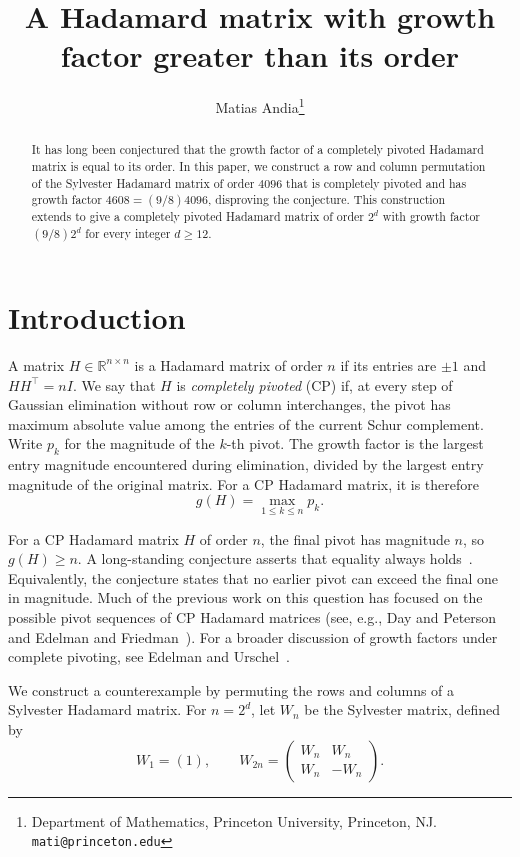 \documentclass{article}
\title{A Hadamard matrix with growth factor greater than its order}
\author{Matias Andia\thanks{Department of Mathematics, Princeton University,
Princeton, NJ. \texttt{mati@princeton.edu}}}
\date{}
\newcommand{\RR}{\mathbb{R}}
\begin{document}
\maketitle

\begin{abstract}
It has long been conjectured that the growth factor of a completely pivoted
Hadamard matrix is equal to its order. In this paper, we construct a row and
column permutation of the Sylvester Hadamard matrix of order $4096$ that is
completely pivoted and has growth factor $4608=(9/8)4096$, disproving the conjecture. This construction extends to give a completely pivoted Hadamard matrix of order $2^d$ with growth factor $(9/8)2^d$ for every integer $d\ge12$.
\end{abstract}

\section{Introduction}\label{sec:introduction}
A matrix $H\in\RR^{n\times n}$ is a Hadamard matrix of order $n$ if its
entries are $\pm1$ and $HH^\top=nI$. We say that $H$ is \emph{completely pivoted} (CP) if, at every step of Gaussian elimination without row or column interchanges, the pivot has maximum absolute value among the entries of the current Schur complement. Write $p_k$ for the magnitude
of the $k$-th pivot. The growth factor is the largest entry magnitude
encountered during elimination, divided by the largest entry magnitude of
the original matrix. For a CP Hadamard matrix, it is therefore
\[
       g(H)=\max_{1\le k\le n}p_k.
\]

For a CP Hadamard matrix $H$ of order $n$, the final pivot has magnitude $n$, so $g(H)\ge n$. A long-standing conjecture asserts that equality always holds~\cite{Cryer,DP}. Equivalently, the conjecture states that no earlier pivot
can exceed the final one in magnitude. Much of the previous
work on this question has focused on the possible pivot sequences of CP Hadamard matrices (see, e.g.,
Day and Peterson~\cite{DP} and Edelman and
Friedman~\cite{EF}). For a broader discussion of growth factors under complete pivoting, see Edelman and Urschel~\cite{EU}.

We construct a counterexample by permuting the rows and columns of a Sylvester Hadamard matrix. For
$n=2^d$, let $W_n$ be the Sylvester matrix, defined by
\[
 W_1=(1),\qquad
 W_{2n}=\begin{pmatrix}W_n&W_n\\W_n&-W_n\end{pmatrix}.
\]
\end{document}
